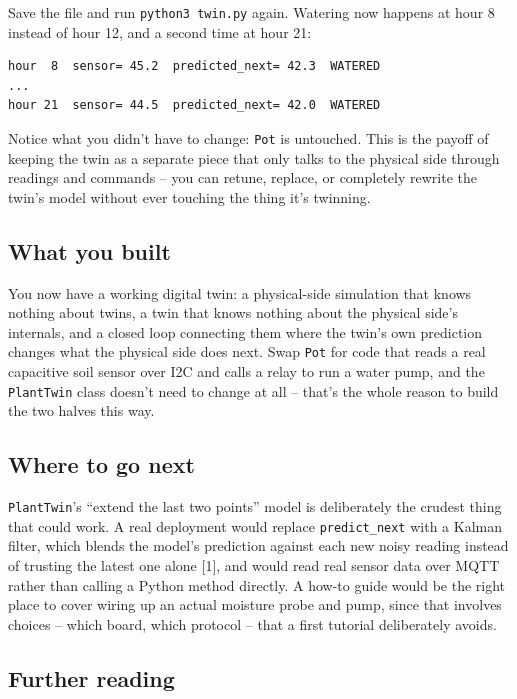 \documentclass[
  12pt,
  a4paper,
]{article}
\begin{document}
Save the file and run \texttt{python3\ twin.py} again. Watering now
happens at hour 8 instead of hour 12, and a second time at hour 21:

\begin{verbatim}
hour  8  sensor= 45.2  predicted_next= 42.3  WATERED
...
hour 21  sensor= 44.5  predicted_next= 42.0  WATERED
\end{verbatim}

Notice what you didn't have to change: \texttt{Pot} is untouched. This
is the payoff of keeping the twin as a separate piece that only talks to
the physical side through readings and commands -- you can retune,
replace, or completely rewrite the twin's model without ever touching
the thing it's twinning.

\subsection{What you built}\label{what-you-built}

You now have a working digital twin: a physical-side simulation that
knows nothing about twins, a twin that knows nothing about the physical
side's internals, and a closed loop connecting them where the twin's own
prediction changes what the physical side does next. Swap \texttt{Pot}
for code that reads a real capacitive soil sensor over I2C and calls a
relay to run a water pump, and the \texttt{PlantTwin} class doesn't need
to change at all -- that's the whole reason to build the two halves this
way.

\subsection{Where to go next}\label{where-to-go-next}

\texttt{PlantTwin}'s ``extend the last two points'' model is
deliberately the crudest thing that could work. A real deployment would
replace \texttt{predict\_next} with a Kalman filter, which blends the
model's prediction against each new noisy reading instead of trusting
the latest one alone {[}1{]}, and would read real sensor data over MQTT
rather than calling a Python method directly. A how-to guide would be
the right place to cover wiring up an actual moisture probe and pump,
since that involves choices -- which board, which protocol -- that a
first tutorial deliberately avoids.

\subsection{Further reading}\label{further-reading}
\end{document}
